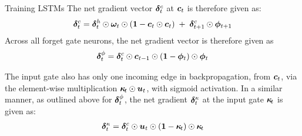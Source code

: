 \begin{frame}{Training LSTMs}
The net gradient vector ${\bm \delta}^c_t$ at ${\boldsymbol c}_t$ is therefore given as:
\begin{align*}
    {\bm \delta}_t^c = {\bm \delta}_t^h \odot {\bm \omega}_t \odot (\mathbf{1} - {\boldsymbol c}_t
    \odot {\boldsymbol c}_t) \; +\; {\bm \delta}_{t+1}^c \odot {\bm \phi}_{t+1}
\end{align*}
%
Across all forget gate neurons, the net gradient vector is therefore
given as
\begin{align*}
    {\bm \delta}_t^\phi = {\bm \delta}_t^c \odot {\boldsymbol c}_{t-1} \odot  (\mathbf{1} - {\bm \phi}_t) \odot {\bm \phi}_t
\end{align*}

The input gate also has only one incoming edge in backpropagation, from
${\boldsymbol c}_t$, via the element-wise multiplication ${\bm \kappa}_{\!t} \odot
{\boldsymbol u}_{t}$, with sigmoid activation. In a similar manner, as outlined above
for ${\bm \delta}_t^\phi$, the net gradient ${\bm \delta}_t^\kappa$ at the input
gate ${\bm \kappa}_{\!t}$ is given as: 
\begin{align*}
    {\bm \delta}_t^\kappa = {\bm \delta}_t^c \odot {\boldsymbol u}_t \odot  (\mathbf{1} -
    {\bm \kappa}_{\!t}) \odot {\bm \kappa}_{\!t}
\end{align*}
\end{frame}

